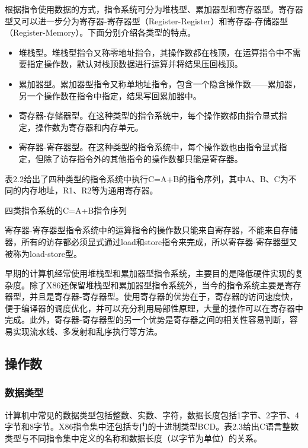\documentclass[]{ctexbook}
\begin{document}
根据指令使用数据的方式，指令系统可分为堆栈型、累加器型和寄存器型。寄存器型又可以进一步分为寄存器-寄存器型（Register-Register）和寄存器-存储器型（Register-Memory）。下面分别介绍各类型的特点。

\begin{itemize}
\item
  堆栈型。堆栈型指令又称零地址指令，其操作数都在栈顶，在运算指令中不需要指定操作数，默认对栈顶数据进行运算并将结果压回栈顶。
\item
  累加器型。累加器型指令又称单地址指令，包含一个隐含操作数------累加器，另一个操作数在指令中指定，结果写回累加器中。
\item
  寄存器-存储器型。在这种类型的指令系统中，每个操作数都由指令显式指定，操作数为寄存器和内存单元。
\item
  寄存器-寄存器型。在这种类型的指令系统中，每个操作数也由指令显式指定，但除了访存指令外的其他指令的操作数都只能是寄存器。
\end{itemize}

表2.2给出了四种类型的指令系统中执行C=A+B的指令序列，其中A、B、C为不同的内存地址，R1、R2等为通用寄存器。

\label{tab:isatype}四类指令系统的C=A+B指令序列

寄存器-寄存器型指令系统中的运算指令的操作数只能来自寄存器，不能来自存储器，所有的访存都必须显式通过load和store指令来完成，所以寄存器-寄存器型又被称为load-store型。

早期的计算机经常使用堆栈型和累加器型指令系统，主要目的是降低硬件实现的复杂度。除了X86还保留堆栈型和累加器型指令系统外，当今的指令系统主要是寄存器型，并且是寄存器-寄存器型。使用寄存器的优势在于，寄存器的访问速度快，便于编译器的调度优化，并可以充分利用局部性原理，大量的操作可以在寄存器中完成。此外，寄存器-寄存器型的另一个优势是寄存器之间的相关性容易判断，容易实现流水线、多发射和乱序执行等方法。

\hypertarget{ux64cdux4f5cux6570}{%
\subsection{操作数}\label{ux64cdux4f5cux6570}}

\hypertarget{ux6570ux636eux7c7bux578b}{%
\subsubsection{数据类型}\label{ux6570ux636eux7c7bux578b}}

计算机中常见的数据类型包括整数、实数、字符，数据长度包括1字节、2字节、4字节和8字节。X86指令集中还包括专门的十进制类型BCD。表2.3给出C语言整数类型与不同指令集中定义的名称和数据长度（以字节为单位）的关系。
\end{document}
